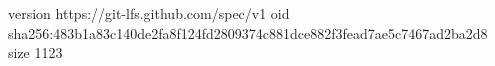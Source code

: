 version https://git-lfs.github.com/spec/v1
oid sha256:483b1a83c140de2fa8f124fd2809374c881dce882f3fead7ae5c7467ad2ba2d8
size 1123
